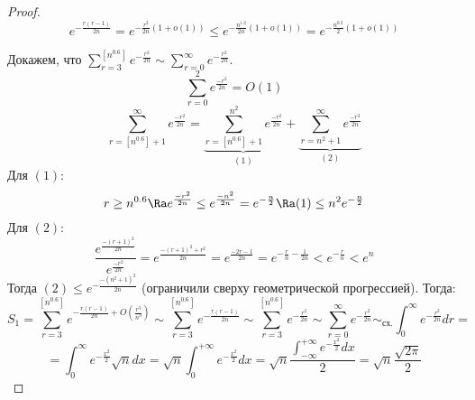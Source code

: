 \begin{proof}
    \[e^{-\frac{r(r-1)}{2n}} = e^{-\frac{r^2}{2n}(1 + o(1))} \le e^{-\frac{n^{1.2}}{2n}(1 + o(1))} = e^{-\frac{n^{0.2}}{2}(1 + o(1))}\]

    Докажем, что \(\sum_{r = 3}^{[n^{0.6}]}e^{-\frac{r^2}{2n}} \sim \sum_{r = 0}^{\infty}e^{-\frac{r^2}{2n}}\).
    \[\sum_{r = 0}^2e^{\frac{-r^2}{2n}} = O(1)\]
    \[\sum_{r = [n^{0.6}] + 1}^\infty e^{\frac{-r^2}{2n}} = \underbrace{\sum_{r = [n^{0.6}] + 1}^{n^2} e^{\frac{-r^2}{2n}}}_{(1)} + \underbrace{\sum_{r = n^2 + 1}^\infty e^{\frac{-r^2}{2n}}}_{(2)}\]
    Для \((1)\):
    \[r \ge n^{0.6} \Ra e^{\frac{-r^2}{2n}} \le e^{\frac{-n^2}{2n}} = e^{-\frac{n}{2}} \Ra (1) \le n^2e^{-\frac{n}{2}}\]
    Для \((2)\):
    \[\frac{e^{\frac{-(r + 1)^2}{2n}}}{e^{\frac{-r^2}{2n}}}= e^{\frac{-(r+1)^2 + r^2}{2n}} = e^{\frac{-2r - 1}{2n}} = e^{-\frac{r}{n} - \frac{1}{2n}} < e^{-\frac{r}{n}} < e^n\]
    Тогда \((2) \le e^{-\frac{-(n^2 + 1)^2}{2n}}\) (ограничили сверху геометрической прогрессией). Тогда:
    \[S_1 = \sum_{r = 3}^{[n^{0.6}]}e^{-\frac{r(r-1)}{2n} + O\left(\frac{r^3}{n^3}\right)} \sim \sum_{r = 3}^{[n^{0.6}]}e^{-\frac{r(r-1)}{2n}} \sim \sum_{r = 3}^{[n^{0.6}]}e^{-\frac{r^2}{2n}} \sim \sum_{r = 0}^{\infty}e^{-\frac{r^2}{2n}} \sim_{\text{сх.}} \int_0^\infty e^{-\frac{r^2}{2n}}dr = \]
    \[ = \int_0^\infty e^{-\frac{x^2}{2}}\sqrt{n}dx = \sqrt{n}\int_{0}^{+\infty} e^{-\frac{x^2}{2}}dx = \sqrt{n}\frac{\int_{-\infty}^{+\infty} e^{-\frac{x^2}{2}}dx}{2} = \sqrt{n}\frac{\sqrt{2\pi}}{2}\]
\end{proof}